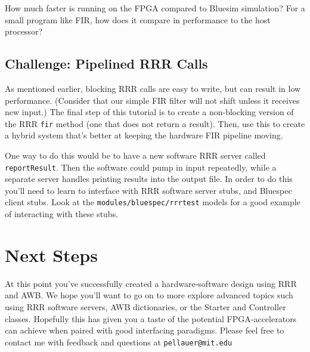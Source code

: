 \documentclass{article}
\begin{document}
How much faster is running on the FPGA compared to Bluesim simulation? For a small program like FIR, how does it compare in performance to the host processor?

\subsection{Challenge: Pipelined RRR Calls}

As mentioned earlier, blocking RRR calls are easy to write, but can result in low performance. (Consider that our simple FIR filter will not shift unless it
receives new input.) The final step of this tutorial is to create a non-blocking version of the RRR \texttt{fir} method (one that does not return a result). Then, 
use this to create a hybrid system that's better at keeping the hardware FIR pipeline moving.

One way to do this would be to have a new software RRR server called \texttt{reportResult}. Then the software could pump in input repeatedly, while a separate
server handles printing results into the output file. In order to do this you'll need to learn to interface with RRR software server stubs, and Bluespec client
stubs. Look at the \texttt{modules/bluespec/rrrtest} models for a good example of interacting with these stubs.

\section{Next Steps}

At this point you've successfully created a hardware-software design using RRR and AWB. We hope you'll want to go on to more explore advanced topics such using RRR
software servers, AWB dictionaries, or the Starter and Controller classes. Hopefully this has given you a taste of the potential FPGA-accelerators can achieve when
paired with good interfacing paradigms. Please feel free to contact me with feedback and questions at \texttt{pellauer@mit.edu}
\end{document}
